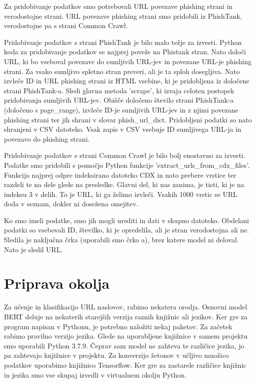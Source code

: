 \documentclass[sigconf,nonacm]{acmart}
\begin{document}
Za pridobivanje podatkov smo potrebovali URL povezave phishing strani in verodostojne strani. URL povezave phishing strani smo pridobili iz PhishTank, verodostojne pa s strani Common Crawl.

Pridobivanje podatkov s strani PhishTank je bilo malo težje za izvesti. Python koda za pridobivanje podatkov se najprej poveže na Phistank stran. Nato določi URL, ki bo vseboval povezave do sumljivih URL-jev in povezane URL-je phishing strani. Za vsako sumljivo spletno stran preveri, ali je ta sploh dosegljiva. Nato izvleče ID in URL phishing strani iz HTML vsebine, ki je pridobljena iz določene strani PhishTank-a. Sledi glavna metoda 'scrape', ki izvaja celoten postopek pridobivanja sumljivih URL-jev. Obišče določeno število strani PhishTank-a (določeno s page\_range), izvleče ID-je sumljivih URL-jev in z njimi povezane phishing strani ter jih shrani v slovar phish\_url\_dict. Pridobljeni podatki so nato shranjeni v CSV datoteko. Vsak zapis v CSV vsebuje ID sumljivega URL-ja in povezavo do phishing strani.

Pridobivanje podatkov s strani Common Crawl je bilo bolj enostavno za izvesti. Podatke smo pridobili s pomočjo Python funkcije 'extract\_urls\_from\_cdx\_files'. Funkcija najprej odpre indeksirano datoteko CDX in nato prebere vrstice ter razdeli te na dele glede na presledke. Glavni del, ki nas zanima, je tisti, ki je na indeksu 3 v delih. To je URL, ki ga želimo izvleči. Vsakih 1000 vrstic se URL doda v seznam, dokler ni dosežena omejitev.

Ko smo imeli podatke, smo jih mogli urediti in dati v skupno datoteko. Obdelani podatki so vsebovali ID, številko, ki je opredelila, ali je stran verodostojna ali ne. Sledila je naključna črka (uporabili smo črko a), brez katere model ni deloval. Nato je sledil URL. 

\section{Priprava okolja}
Za učenje in klasifikacijo URL naslovov, rabimo nekatera orodja. Osnovni model BERT deluje na nekaterih starejših verzija raznih knjižnic ali jezikov. Ker gre za program napisan v Pythonu, je potrebno naložiti nekaj paketov. Za začetek rabimo pravilno verzijo jezika. Glede na uporabljene knjižnice v samem projektu smo uporabili Python 3.7.9. Čeprav sam model ne zahteva te različice jezika, jo pa zahtevajo knjižnice v projektu. Za konverzijo žetonov v učljivo množico podatkov uporabimo knjižnico Tensorflow. Ker gre za zastarele različice knjižnic in jezika smo vse skupaj izvedli v virtualnem okolju Python.
\end{document}
